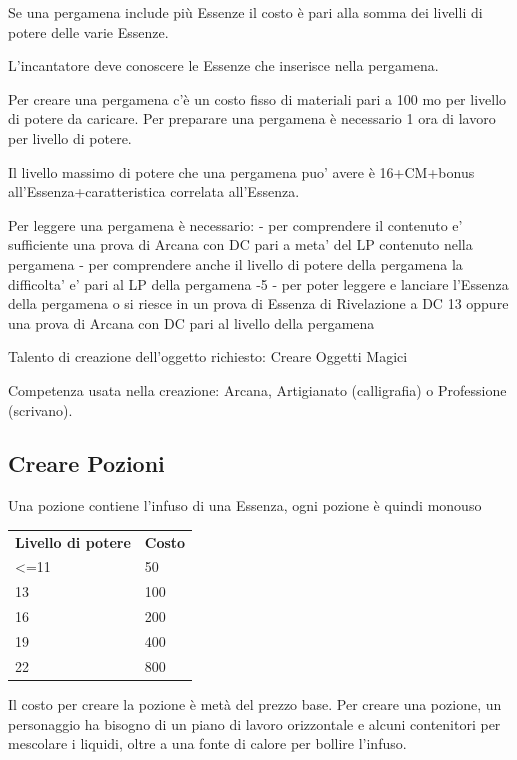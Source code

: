 \documentclass[a4paper,11pt,twoside,openany]{book}
\begin{document}
\bigskip

Se una pergamena include più Essenze il costo è pari alla somma dei livelli di potere delle varie Essenze.

L'incantatore deve conoscere le Essenze che inserisce nella pergamena.

Per creare una pergamena c'è un costo fisso di materiali pari a 100 mo per livello di potere da caricare. Per preparare una pergamena è necessario 1 ora di lavoro per livello di potere.

Il livello massimo di potere che una pergamena puo' avere è 16+CM+bonus all'Essenza+caratteristica correlata all'Essenza.

Per leggere una pergamena è necessario:
- per comprendere il contenuto e' sufficiente una prova di Arcana con DC pari a meta' del LP contenuto nella pergamena
- per comprendere anche il livello di potere della pergamena la difficolta' e' pari al LP della pergamena -5
- per poter leggere e lanciare l'Essenza della pergamena o si riesce in un prova di Essenza di Rivelazione a DC 13 oppure una prova di Arcana con DC pari al livello della pergamena

Talento di creazione dell'oggetto richiesto: Creare Oggetti Magici

Competenza usata nella creazione: Arcana, Artigianato (calligrafia) o Professione (scrivano).

\subsection{Creare Pozioni}

Una pozione contiene l'infuso di una Essenza, ogni pozione è quindi monouso

\bigskip

\begin{tabular}{ll}
	\toprule
	\textbf{Livello di potere} & \textbf{Costo}\\
	\textless=11               & 50\\
	13         & 100\\
	16         & 200\\
	19         & 400\\
	22         & 800\\
\end{tabular}

\bigskip

Il costo per creare la pozione è metà del prezzo base. Per creare una pozione, un personaggio ha bisogno di un piano di lavoro orizzontale e alcuni contenitori per mescolare i liquidi, oltre a una fonte di calore per bollire l'infuso.
\end{document}

